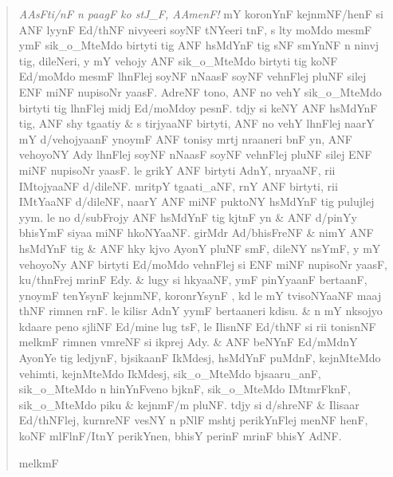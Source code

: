 \documentclass[12pt,paper=a4]{scrartcl}
\newcommand{\fw}[1]{\textit{#1}} %
\newenvironment{ayeri}{
    \doublespacing
    \Tagati
}{
}
\begin{document}
\begin{quotation}
	\begin{ayeri}
		\fw{AAsFti/nF n paagF ko stJ\_F, AAmenF!} %
			mY koronYnF kejnmNF/henF si ANF lyynF Ed/thNF nivyeeri 
			soyNF tNYeeri tnF, s lty moMdo mesmF ymF sik\_o\_MteMdo 
			birtyti tig ANF hsMdYnF tig sNF smYnNF n ninvj tig, 
			dileNeri, y mY vehojy ANF sik\_o\_MteMdo birtyti tig 
			koNF Ed/moMdo mesmF lhnFlej soyNF nNaasF soyNF vehnF\-lej 
			pluNF silej ENF miNF nupisoNr yaasF. %
		AdreNF tono, ANF no vehY sik\_o\_MteMdo birtyti tig lhnFlej midj 
			Ed/moMdoy pesnF. %
		tdjy si keNY ANF hsMdYnF tig, ANF shy tgaatiy \& s tirj\-yaaNF 
			birtyti, ANF no vehY lhnF\-lej naarY mY d/vehojyaanF 
			ynoymF ANF tonisy mrtj nraaneri bnF yn, ANF veho\-yoNY 
			Ady lhnFlej soyNF nNaasF soyNF vehnFlej pluNF silej ENF 
			miNF nupisoNr yaasF. %
		le grikY ANF birtyti AdnY, nryaaNF, rii IMtojyaaNF d/dileNF. %
		mritpY tgaati\_aNF, rnY ANF birtyti, rii IMtYaaNF d/dileNF,
			naarY ANF miNF puktoNY hsMdYnF tig pulujlej yym. %
		le no d/subFrojy ANF hsMdYnF tig kjtnF yn \& ANF d/pinYy bhisYmF 
			siyaa miNF hkoNYaaNF. %
		girMdr Ad/bhisFreNF \& nimY ANF hsMdYnF tig \& ANF hky kjvo 
			AyonY pluNF smF, dileNY nsYmF, y mY vehoyoNy ANF 
			birtyti Ed/moMdo vehnFlej si ENF miNF nupisoNr yaasF, 
			ku/thnFrej mrinF Edy. %
		\& lugy si hkyaaNF, ymF pinYyaanF bertaanF, ynoymF tenYsynF 
			kejnmNF, koronrYsynF \+, kd le mY tvisoNYaaNF maaj 
			thNF rimnen rnF. %
		le kilisr AdnY yymF bertaa\-neri kdisu. %
		\& n mY nksojyo kdaare peno sjliNF Ed/mine lug tsF, le IlisnNF
			Ed/thNF si rii tonisnNF melkmF rimnen vmreNF si ikprej 
			Ady. %
		\& ANF beNYnF Ed/mMdnY AyonYe tig ledjynF, bjsikaanF IkMdesj, 
			hsMdYnF puMdnF, kej\-nM\-teMdo vehimti, kej\-nM\-teMdo 
			IkMdesj, sik\_o\_MteMdo bjsaaru\_anF, sik\_o\_MteMdo n 
			hinYnFveno bjknF, sik\_o\_MteMdo IMtmrFknF, 
			sik\_o\_MteMdo piku \& kejnmF/m pluNF. %
		tdjy si d/shreNF \& Ilisaar Ed/\-thNF\-lej, kurnreNF vesNY n 
			pNlF mshtj perikYnFlej menNF henF, koNF mlFlnF/ItnY 
			perikYnen, bhisY perinF mrinF bhisY AdNF. %
		\begin{center}
			melkmF
		\end{center}
	\end{ayeri}
\end{quotation}
\end{document}
